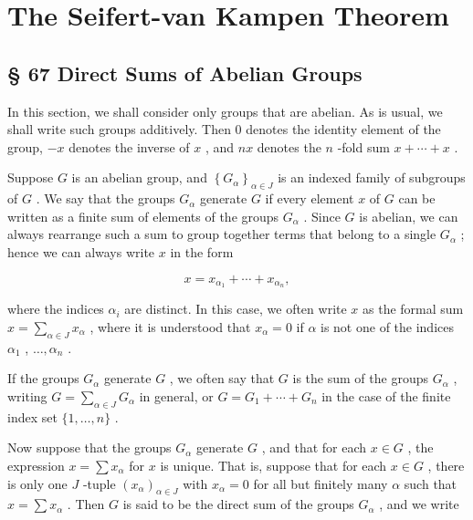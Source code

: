 \chapter{The Seifert-van Kampen Theorem}

\section*{§ 67 Direct Sums of Abelian Groups}

In this section, we shall consider only groups that are abelian. As is usual, we shall write such groups additively. Then 0 denotes the identity element of the group, \(- x\) denotes the inverse of \(x\) , and \({nx}\) denotes the \(n\) -fold sum \(x + \cdots  + x\) .

Suppose \(G\) is an abelian group, and \({\left\{  {G}_{\alpha }\right\}  }_{\alpha  \in  J}\) is an indexed family of subgroups of \(G\) . We say that the groups \({G}_{\alpha }\) generate \(G\) if every element \(x\) of \(G\) can be written as a finite sum of elements of the groups \({G}_{\alpha }\) . Since \(G\) is abelian, we can always rearrange such a sum to group together terms that belong to a single \({G}_{\alpha }\) ; hence we can always write \(x\) in the form

\[
x = {x}_{{\alpha }_{1}} + \cdots  + {x}_{{\alpha }_{n}},
\]

where the indices \({\alpha }_{i}\) are distinct. In this case, we often write \(x\) as the formal sum \(x = \mathop{\sum }\limits_{{\alpha  \in  J}}{x}_{\alpha }\) , where it is understood that \({x}_{\alpha } = 0\) if \(\alpha\) is not one of the indices \({\alpha }_{1}\) , \(\ldots ,{\alpha }_{n}\) .

If the groups \({G}_{\alpha }\) generate \(G\) , we often say that \(G\) is the sum of the groups \({G}_{\alpha }\) , writing \(G = \mathop{\sum }\limits_{{\alpha  \in  J}}{G}_{\alpha }\) in general, or \(G = {G}_{1} + \cdots  + {G}_{n}\) in the case of the finite index set \(\{ 1,\ldots ,n\}\) .

Now suppose that the groups \({G}_{\alpha }\) generate \(G\) , and that for each \(x \in  G\) , the expression \(x = \sum {x}_{\alpha }\) for \(x\) is unique. That is, suppose that for each \(x \in  G\) , there is only one \(J\) -tuple \({\left( {x}_{\alpha }\right) }_{\alpha  \in  J}\) with \({x}_{\alpha } = 0\) for all but finitely many \(\alpha\) such that \(x = \sum {x}_{\alpha }\) . Then \(G\) is said to be the direct sum of the groups \({G}_{\alpha }\) , and we write

